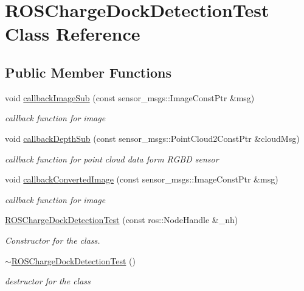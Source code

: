 \hypertarget{class_r_o_s_charge_dock_detection_test}{}\section{R\+O\+S\+Charge\+Dock\+Detection\+Test Class Reference}
\label{class_r_o_s_charge_dock_detection_test}
\subsection*{Public Member Functions}
\begin{DoxyCompactItemize}
\item 
void \hyperlink{class_r_o_s_charge_dock_detection_test_af3dbe9f04a082ff4f6966a34d39338df}{callback\+Image\+Sub} (const sensor\+\_\+msgs\+::\+Image\+Const\+Ptr \&msg)
\begin{DoxyCompactList}\small\item\em callback function for image \end{DoxyCompactList}\item 
void \hyperlink{class_r_o_s_charge_dock_detection_test_ae84b15586fad6a09b68ad348b8258cae}{callback\+Depth\+Sub} (const sensor\+\_\+msgs\+::\+Point\+Cloud2\+Const\+Ptr \&cloud\+Msg)
\begin{DoxyCompactList}\small\item\em callback function for point cloud data form R\+G\+BD sensor \end{DoxyCompactList}\item 
void \hyperlink{class_r_o_s_charge_dock_detection_test_aca862064ae28a6effaed24cf9f06edca}{callback\+Converted\+Image} (const sensor\+\_\+msgs\+::\+Image\+Const\+Ptr \&msg)
\begin{DoxyCompactList}\small\item\em callback function for image \end{DoxyCompactList}\item 
\hyperlink{class_r_o_s_charge_dock_detection_test_a559ef16849a7cc15f8c3759142d0162f}{R\+O\+S\+Charge\+Dock\+Detection\+Test} (const ros\+::\+Node\+Handle \&\+\_\+nh)
\begin{DoxyCompactList}\small\item\em Constructor for the class. \end{DoxyCompactList}\item 
\hyperlink{class_r_o_s_charge_dock_detection_test_a85c12f8e57a53a86fe000847c3f80def}{$\sim$\+R\+O\+S\+Charge\+Dock\+Detection\+Test} ()
\begin{DoxyCompactList}\small\item\em destructor for the class \end{DoxyCompactList}\end{DoxyCompactItemize}
